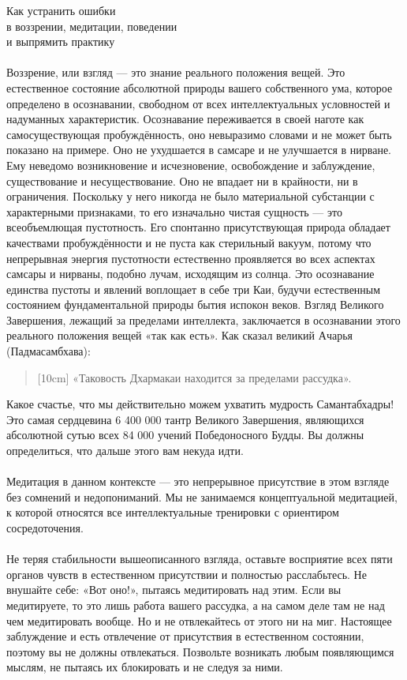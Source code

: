 \large Как устранить ошибки \\
       в воззрении, медитации, поведении \\
       и выпрямить практику
\normalsize
\\
\\
Воззрение, или взгляд — это знание реального положения вещей. Это естественное состояние абсолютной природы вашего собственного ума, которое определено в осознавании, свободном от всех интеллектуальных условностей и надуманных характеристик. Осознавание переживается в своей наготе как самосуществующая пробуждённость, оно невыразимо словами и не может быть показано на примере. Оно не ухудшается в самсаре и не улучшается в нирване. Ему неведомо возникновение и исчезновение, освобождение и заблуждение, существование и несуществование. Оно не впадает ни в крайности, ни в ограничения. Поскольку у него никогда не было материальной субстанции с характерными признаками, то его изначально чистая сущность — это всеобъемлющая пустотность. Его спонтанно присутствующая природа обладает качествами пробуждённости и не пуста как стерильный вакуум, потому что непрерывная энергия пустотности естественно проявляется во всех аспектах самсары и нирваны, подобно лучам, исходящим из солнца. Это осознавание единства пустоты и явлений воплощает в себе три Каи, будучи естественным состоянием фундаментальной природы бытия испокон веков. Взгляд Великого Завершения, лежащий за пределами интеллекта, заключается в осознавании этого реального положения вещей «так как есть». Как сказал великий Ачарья (Падмасамбхава):
\begin{verse}[10cm]
«Таковость Дхармакаи находится за пределами рассудка».
\end{verse}
Какое счастье, что мы действительно можем ухватить мудрость Самантабхадры! Это самая сердцевина 6 400 000 тантр Великого Завершения, являющихся абсолютной сутью всех 84 000 учений Победоносного Будды. Вы должны определиться, что дальше этого вам некуда идти.
\\ \\ Медитация в данном контексте — это непрерывное присутствие в этом взгляде без сомнений и недопониманий. Мы не занимаемся концептуальной медитацией, к которой относятся все интеллектуальные тренировки с ориентиром сосредоточения.
\\ \\ Не теряя стабильности вышеописанного взгляда, оставьте восприятие всех пяти органов чувств в естественном присутствии и полностью расслабьтесь. Не внушайте себе: «Вот оно!», пытаясь медитировать над этим. Если вы медитируете, то это лишь работа вашего рассудка, а на самом деле там не над чем медитировать вообще. Но и не отвлекайтесь от этого ни на миг. Настоящее заблуждение и есть отвлечение от присутствия в естественном состоянии, поэтому вы не должны отвлекаться. Позвольте возникать любым появляющимся мыслям, не пыта\-ясь их блокировать и не следуя за ними.
